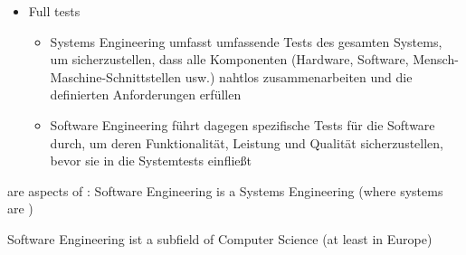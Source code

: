 \begin{defBox}[title=Systems Engineering (Systemtechnik) vs. Software Engineering]
\begin{itemize}
\begin{infoBox}
        \end{infoBox}
        \item Full  tests
        \begin{infoBox}
            \begin{itemize}
                \item Systems Engineering umfasst umfassende Tests des gesamten Systems, um sicherzustellen, dass alle Komponenten (Hardware, Software, Mensch-Maschine-Schnittstellen usw.) nahtlos zusammenarbeiten und die definierten Anforderungen erfüllen
                \item Software Engineering führt dagegen spezifische Tests für die Software durch, um deren Funktionalität, Leistung und Qualität sicherzustellen, bevor sie in die Systemtests einfließt
            \end{itemize}
        \end{infoBox}
    \end{itemize}
    are aspects of : Software Engineering is a  Systems Engineering (where systems are )
\end{defBox}
\begin{defBox}[title=Computer Science vs. Software Engineering]
    Software Engineering ist a subfield of Computer Science (at least in Europe)
\end{defBox}
